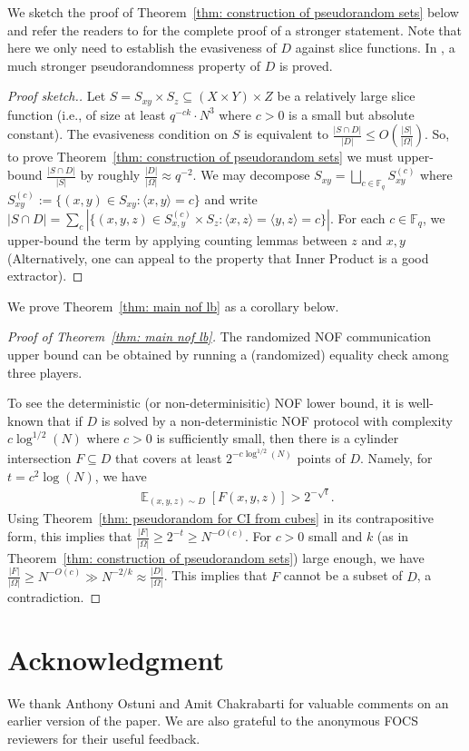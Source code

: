 \documentclass[11pt]{article}
\DeclareMathOperator*{\E}{\mathbb{E}}
\newcommand{\1}{ \mathbbm{1}}
\begin{document}
We sketch the proof of Theorem~\ref{thm: construction of pseudorandom sets} below and refer the readers to \cite{KelleyLM2024-nof} for the complete proof of a stronger statement. Note that here we only need to establish the evasiveness of $D$ against slice functions. In \cite{KelleyLM2024-nof}, a much stronger pseudorandomness property of $D$ is proved.

\begin{proof}[Proof sketch.]
    Let $S = S_{xy} \times S_z \subseteq (X\times Y) \times Z$ be a relatively large slice function (i.e., of size at least $q^{-ck}\cdot N^3$ where $c > 0$ is a small but absolute constant). The evasiveness condition on $S$ is equivalent to $\frac{|S\cap D|}{|D|} \le O\left( \frac{|S|}{|\Omega|} \right)$. So, to prove Theorem~\ref{thm: construction of pseudorandom sets} we must upper-bound $\frac{|S\cap D|}{|S|}$ by roughly $\frac{|D|}{|\Omega|}\approx q^{-2}$. We may decompose $S_{xy} = \bigsqcup_{c\in \mathbb{F}_q} S_{xy}^{(c)}$ where $S_{xy}^{(c)} := \{(x,y)\in S_{xy} : \langle x, y\rangle = c\}$ and write $|S\cap D| = \sum_{c} |\{(x,y,z)\in S_{x,y}^{(c)}\times S_z: \langle x,z\rangle = \langle y,z\rangle = c\}|$. For each $c\in \mathbb{F}_q$, we upper-bound the term by applying counting lemmas between $z$ and $x,y$ (Alternatively, one can appeal to the property that Inner Product is a good extractor).
\end{proof}

We prove Theorem~\ref{thm: main nof lb} as a corollary below. 

\begin{proof}[Proof of Theorem~\ref{thm: main nof lb}]
The randomized NOF communication upper bound can be obtained by running a (randomized) equality check among three players.

To see the deterministic (or non-determinisitic) NOF lower bound, it is well-known that if $D$ is solved by a non-deterministic NOF protocol with complexity $c\log^{1/2}(N)$ where $c > 0$ is sufficiently small, then there is a cylinder intersection $F\subseteq D$ that covers at least $2^{-c\log^{1/2}(N)}$ points of $D$. Namely, for $t = c^2 \log(N)$, we have
\begin{align*}
    \E_{(x,y,z)\sim D}[F(x,y,z)]  >  2^{-\sqrt{t}}.
\end{align*}
Using Theorem~\ref{thm: pseudorandom for CI from cubes} in its contrapositive form, this implies that $\frac{|F|}{|\Omega|} \ge 2^{-t} \ge N^{-O(c)}$. For $c > 0$ small and $k$ (as in Theorem~\ref{thm: construction of pseudorandom sets}) large enough, we have $\frac{|F|}{|\Omega|}  \ge N^{-O(c)} \gg N^{-2/k} \approx \frac{|D|}{|\Omega|}$. This implies that $F$ cannot be a subset of $D$, a contradiction.
\end{proof}

\section*{Acknowledgment}

We thank Anthony Ostuni and Amit Chakrabarti for valuable comments on an earlier version of the paper. We are also grateful to the anonymous FOCS reviewers for their useful feedback.



\end{document}

